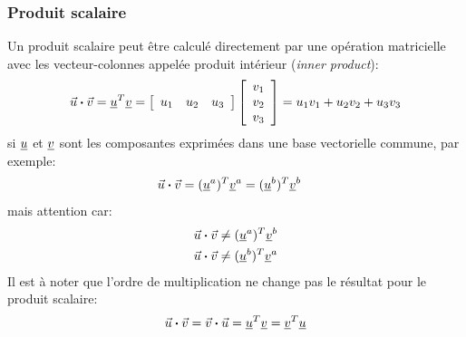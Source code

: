 \subsubsection{Produit scalaire}
Un produit scalaire peut être calculé directement par une opération matricielle avec les vecteur-colonnes appelée produit intérieur (\textit{inner product}):
\begin{equation}
\vec{u} \boldsymbol{\cdot} \vec{v} = \underline{u}^T \underline{v} = \left[ \begin{array}{c c c} u_1 & u_2 & u_3  \end{array} \right]  \left[ \begin{array}{c} v_1 \\ v_2 \\ v_3  \end{array} \right]
= u_1 v_1 + u_2 v_2 + u_3 v_3
\end{equation} 
si $\underline{u}$ et $\underline{v}$ sont les composantes exprimées dans une base vectorielle commune, par exemple:
\begin{align}
\vec{u} \boldsymbol{\cdot} \vec{v} &= (\underline{u}^a)^T \underline{v}^a = (\underline{u}^b)^T \underline{v}^b
\end{align} 
mais attention car: 
\begin{align}
\vec{u} \boldsymbol{\cdot} \vec{v} &\ne (\underline{u}^a)^T \underline{v}^b \\
\vec{u} \boldsymbol{\cdot} \vec{v} &\ne (\underline{u}^b)^T \underline{v}^a 
\end{align} 
Il est à noter que l'ordre de multiplication ne change pas le résultat pour le produit scalaire:
\begin{equation}
\vec{u} \boldsymbol{\cdot} \vec{v} = \vec{v} \boldsymbol{\cdot} \vec{u} = \underline{u}^T \underline{v} = \underline{v}^T \underline{u} 
\end{equation} 

